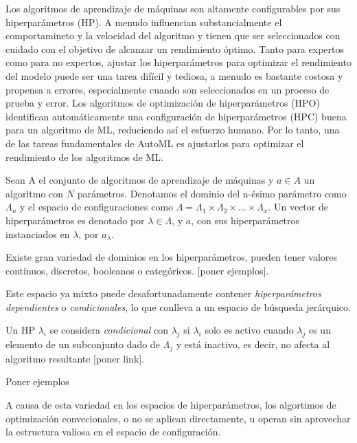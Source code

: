 Los algoritmos de aprendizaje de máquinas son altamente configurables por sus hiperparámetros (HP). A menudo influencian substancialmente el comportamineto y la velocidad del algoritmo y tienen que ser seleccionados con cuidado con el objetivo de alcanzar un rendimiento óptimo. Tanto para expertos como para no expertos, ajustar los hiperparámetros para optimizar el rendimiento del modelo puede ser una tarea difícil y tediosa, a menudo es bastante costosa y propensa a errores, especialmente cuando son seleccionados en un proceso de prueba y error. Los algoritmos de optimización de hiperparámetros (HPO) identifican automáticamente una configuración de hiperparámetros (HPC) buena para un algoritmo de ML, reduciendo así el esfuerzo humano. Por lo tanto, una de las tareas fundamentales de AutoML es ajustarlos para optimizar el rendimiento de los algoritmos de ML.

\begin{definition}
	Sean A el conjunto de algoritmos de aprendizaje de máquinas y $a \in A$ un algoritmo con $N$ parámetros. Denotamos el dominio del n-ésimo parámetro como $\Lambda_n$ y el espacio de configuraciones como $\Lambda = \Lambda_1 \times \Lambda_2 \times ... \times \Lambda_x$. Un vector de hiperparámetros es denotado por $\lambda \in \Lambda$, y $a$, con sus hiperparámetros instanciados en $\lambda$, por $a_\lambda$.
\end{definition}


Existe gran variedad de dominios en los hiperparámetros, pueden tener valores continuos, discretos, booleanos o categóricos. [poner ejemplos]. 

Este espacio ya mixto puede desafortunadamente contener \textit{hiperparámetros dependientes} o \textit{condicionales}, lo que conlleva a un espacio de búsqueda jerárquico.

\begin{definition}
	Un HP $\lambda_i$ se considera \textit{condicional} con $\lambda_j$ si $\lambda_i$ solo es activo cuando $\lambda_j$ es un elemento de un subconjunto dado de $\Lambda_j$ y está inactivo, es decir, no afecta al algoritmo resultante [poner link].  
\end{definition} 

Poner ejemplos

A causa de esta variedad en los espacios de hiperparámetros, los algortimos de optimización convecionales, o no se aplican directamente, u operan sin aprovechar la estructura valiosa en el espacio de configuración.

